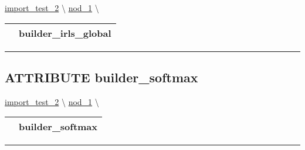 \hypertarget{ecldoc:constants.builder_irls_global}{}
\hspace{0pt} \hyperlink{ecldoc:import_test_2}{import_test_2} \textbackslash 
\hspace{0pt} \hyperlink{ecldoc:Constants}{nod_1} \textbackslash 

{\renewcommand{\arraystretch}{1.5}
\begin{tabularx}{\textwidth}{|>{\raggedright\arraybackslash}l|X|}
\hline
\hspace{0pt}\mytexttt{\color{red} } & \textbf{builder\_irls\_global} \\
\hline
\end{tabularx}
}

\par


\rule{\linewidth}{0.5pt}
\subsection*{\textsf{\colorbox{headtoc}{\color{white} ATTRIBUTE}
builder\_softmax}}

\hypertarget{ecldoc:constants.builder_softmax}{}
\hspace{0pt} \hyperlink{ecldoc:import_test_2}{import_test_2} \textbackslash 
\hspace{0pt} \hyperlink{ecldoc:Constants}{nod_1} \textbackslash 

{\renewcommand{\arraystretch}{1.5}
\begin{tabularx}{\textwidth}{|>{\raggedright\arraybackslash}l|X|}
\hline
\hspace{0pt}\mytexttt{\color{red} } & \textbf{builder\_softmax} \\
\hline
\end{tabularx}
}

\par


\rule{\linewidth}{0.5pt}




